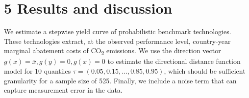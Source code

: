 \documentclass[
  10pt,
]{article}
\begin{document}
\hypertarget{results-and-discussion}{%
\section{5 Results and discussion}\label{results-and-discussion}}

We estimate a stepwise yield curve of probabilistic benchmark
technologies. These technologies extract, at the observed performance
level, country-year marginal abatement costs of CO\textsubscript{2}
emissions. We use the direction vector \(g(x)=\bar{x}, g(y)=0, g(x)=0\)
to estimate the directional distance function model for 10 quantiles
\(\tau=(0.05,0.15,\dots,0.85,0.95)\), which should be sufficient
granularity for a sample size of 525. Finally, we include a noise term
that can capture measurement error in the data.

\begingroup\fontsize{8}{10}\selectfont
\end{document}
